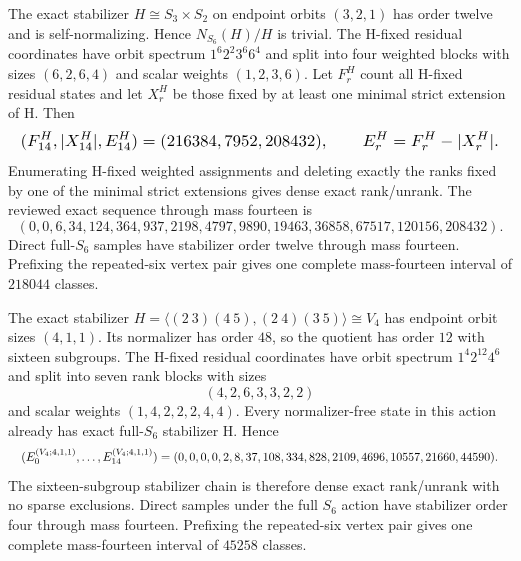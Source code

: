 \documentclass{article}
\newcommand{\fitmath}[1]{\resizebox{0.99\linewidth}{!}{$\displaystyle #1$}}
\begin{document}
The exact stabilizer $H\cong S_3\times S_2$ on endpoint orbits $(3,2,1)$ has
order twelve and is self-normalizing. Hence $N_{S_6}(H)/H$ is trivial. The
H-fixed residual coordinates have orbit spectrum $1^6 2^2 3^6 6^4$ and split
into four weighted blocks with sizes $(6,2,6,4)$ and scalar weights
$(1,2,3,6)$. Let $F_r^H$ count all H-fixed residual states and let $X_r^H$ be
those fixed by at least one minimal strict extension of H. Then
\begin{equation}
  \fitmath{%
    (F_{14}^H,|X_{14}^H|,E_{14}^H)=(216384,7952,208432),
    \qquad E_r^H=F_r^H-|X_r^H|.
  }
  \label{eq:optimization-crazy-sextuple-s6-full-s3-times-s2-ranking}
\end{equation}
Enumerating H-fixed weighted assignments and deleting exactly the ranks fixed by
one of the minimal strict extensions gives dense exact rank/unrank. The reviewed
exact sequence through mass fourteen is
\[
  (0,0,6,34,124,364,937,2198,4797,9890,19463,36858,67517,120156,208432).
\]
Direct full-$S_6$ samples have stabilizer order twelve through mass fourteen.
Prefixing the repeated-six vertex pair gives one complete mass-fourteen
interval of $218044$ classes.

The exact stabilizer
$H=\langle(2\ 3)(4\ 5),(2\ 4)(3\ 5)\rangle\cong V_4$ has endpoint orbit
sizes $(4,1,1)$. Its normalizer has order $48$, so the quotient has order
$12$ with sixteen subgroups. The H-fixed residual coordinates have orbit
spectrum $1^4 2^{12}4^6$ and split into seven rank blocks with sizes
\[
  (4,2,6,3,3,2,2)
\]
and scalar weights $(1,4,2,2,2,4,4)$. Every normalizer-free state in this
action already has exact full-$S_6$ stabilizer H. Hence
\begin{equation}
  \fitmath{%
    (E_0^{(V_4;4,1,1)},\ldots,E_{14}^{(V_4;4,1,1)})=
    (0,0,0,0,2,8,37,108,334,828,2109,4696,10557,21660,44590).
  }
  \label{eq:optimization-crazy-sextuple-s6-full-v4-411-ranking}
\end{equation}
The sixteen-subgroup stabilizer chain is therefore dense exact rank/unrank with
no sparse exclusions. Direct samples under the full $S_6$ action have
stabilizer order four through mass fourteen. Prefixing the repeated-six vertex
pair gives one complete mass-fourteen interval of $45258$ classes.
\end{document}
